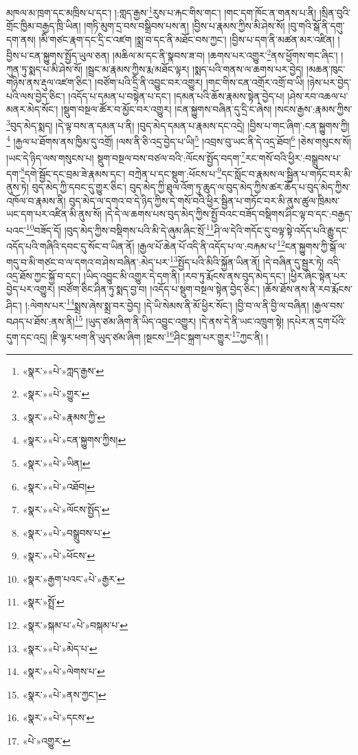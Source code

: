 མཁལ་མ་ཁྲག་དང་མཁྲིས་པ་དང་། །:གླད་རྒྱས་\footnote{«སྣར་»«པེ་»ཀླད་རྒྱས་}རུས་པ་རྐང་གིས་གང་། །གང་དག་ཁོང་ན་གནས་པ་ནི། །སྲིན་བུའི་གྲོང་ཁྱིམ་བརྒྱད་ཁྲི་ཡིན། །གཏི་མུག་དྲ་བས་བསྒྲིབས་པས་ན། །བྱིས་པ་རྣམས་ཀྱིས་མི་ཤེས་སོ། །བུ་གའི་སྒོ་ནི་དགུ་དག་ནས། །མི་གཙང་རྣག་དང་དྲི་ང་འཛག །སྨྲ་བ་དང་ནི་མཐོང་བས་ཀྱང་། །བྱིས་པ་དག་ནི་མཚན་མར་འཛིན། །བྱིས་པ་ངན་སྐྱུགས་སྤྱོད་ཡུལ་ཅན། །མཆིལ་མ་དང་ནི་སྣབས་ཟ་བ། །ཆགས་པར་འགྱུར་\footnote{«སྣར་»«པེ་»གྱུར་}ནས་ཕྱོགས་གང་ཞིང་། །ཀུན་ཏུ་སྨད་པ་མི་ཤེས་སོ། །སྦྲང་མ་རྣམས་ཀྱིས་རྨ་མཐོང་ལྟར། །སྨད་པའི་གནས་ལ་ཆགས་པར་བྱེད། །མཆན་ཁུང་གཉིས་ནས་རྡུལ་འཛག་ཅིང་། །བཙོག་པའི་དྲི་ནི་འབྱུང་བར་འགྱུར། །གང་གིས་ངན་འགྲོར་འགྲོ་བ་ཡི། །ཉེས་པར་བྱེད་པའི་ལས་བྱེད་ཅིང་། །འདོད་པ་དམན་པ་བསྟེན་པ་དང་། །དམན་པའི་ཆོས་རྣམས་སྟེན་བྱེད་པ། །ཤེས་རབ་འཆལ་པ་མནར་མེད་སོང་། །སྡུག་བསྔལ་ཚོར་བ་མྱོང་བར་འགྱུར། །ངན་སྐྱུགས་བཞིན་དུ་དྲི་ང་ཞེས། །སངས་རྒྱས་:རྣམས་ཀྱིས་\footnote{«སྣར་»«པེ་»རྣམས་ཀྱི་}བུད་མེད་སྨད། །དེ་ལྟ་བས་ན་དམན་པ་ནི། །བུད་མེད་དམན་པ་རྣམས་དང་འདྲེ། །བྱིས་པ་གང་ཞིག་:ངན་སྐྱུགས་ཀྱི།\footnote{«སྣར་»«པེ་»ངན་སྐྱུགས་ཀྱིས།} །རྐྱལ་པ་ཐོགས་ནས་ཁྱིམ་དུ་འགྲོ། །ལས་ནི་ཅི་འདྲ་བྱེད་པ་ཡི།\footnote{«སྣར་»«པེ་»ཡིན།} །འབྲས་བུ་ཡང་ནི་དེ་འདྲ་ཐོབ།\footnote{«སྣར་»«པེ་»འཐོབ།} །ཅེས་གསུངས་སོ། །ཡང་དེ་ཉིད་ལས་གསུངས་པ། སྡུག་བསྔལ་བས་བཙལ་བའི་:ལོངས་སྤྱོད་བདག་\footnote{«སྣར་»«པེ་»ལོངས་སྤྱོད་}རང་གསོ་བའི་ཕྱིར་:བསྒྲུབས་པ་དག་\footnote{«སྣར་»«པེ་»བསྒྲུབས་པ་}དགེ་སྦྱོང་དང་བྲམ་ཟེ་རྣམས་དང་། བཀྲེན་པ་དང་སྡུག་:ཕོངས་པ་\footnote{«སྣར་»«པེ་»ཕོངས་}དང་སློང་བ་རྣམས་ལ་སྦྱིན་པ་གཏོང་བར་མི་ནུས་ཏེ། བུད་མེད་ཀྱི་དབང་དུ་གྱུར་ཅིང་། བུད་མེད་ཀྱི་ཐུལ་འོག་ཏུ་ཆུད་ལ་བུད་མེད་ཀྱིས་ཚར་ཆོད་པ་བུད་མེད་ཀྱིས་འཁོལ་བ་རྣམས་ནི། བུད་མེད་ལ་དགའ་བ་དེ་ཉིད་ཀྱིས་དེ་གསོ་བའི་ཕྱིར་སྦྱིན་པ་གཏོང་བར་མི་ནུས་ཚུལ་ཁྲིམས་ཡང་དག་པར་འཛིན་མི་ནུས་སོ། །དེ་དེ་ལ་ཆགས་པས་བུད་མེད་ཀྱིས་སྤྱོ་བའང་བཟོད་བསྡིགས་ཤིང་ལྟ་བ་དང་:བརྒྱད་པའང་\footnote{«སྣར་»རྒྱག་པའང་«པེ་»རྒྱར་}བཟོད་དོ། །བུད་མེད་ཀྱིས་བསྡིགས་པའི་མི་དེ་ཞུམ་ཞིང་སྲོ་\footnote{«སྣར་»སྤྲོ་}ཤི་ལ་དེའི་གདོང་དུ་བལྟ་སྟེ་འདོད་པའི་རྒྱུ་དང་འདོད་པའི་གཞིའི་དབང་དུ་སོང་བ་ཡིན་ནོ། །རྒྱལ་པོ་ཆེན་པོ་འདི་ནི་འདོད་པ་ལ་:བརྐམ་པ་\footnote{«སྣར་»སྐམ་པ་«པེ་»བསྐམ་པ་}ངན་སྐྱུགས་ཀྱི་སྒོ་ལ་གདུ་བ་མི་གཙང་བ་ལ་དགའ་བ་ཤེས་བཞིན་:མེད་པར་\footnote{«སྣར་»«པེ་»མེད་པ་}སྤྱོད་པའི་མིའི་སྐྱོན་ཡིན་ནོ། །དེ་བཞིན་དུ་སྦྱར་ཏེ། འདི་འདྲ་ཐོས་ཀྱང་སྐྱོ་བ་དང་། །ཡིད་འབྱུང་མི་འགྱུར་དེ་དག་ནི། །རབ་ཏུ་རྨོངས་ནས་བུད་མེད་དང་། །ཕྱིར་ཞིང་སྟེན་པར་བྱེད་པར་འགྱུར། །བཙོག་ཅིང་ཤིན་ཏུ་སྨད་བྱ་བ། །འདོད་པ་སྡུག་བསྔལ་སྟེན་བྱེད་ཅིང་། །ཆོས་ཐོས་ནས་ནི་རབ་རྨོངས་ཤིང་། །:ལེགས་པར་\footnote{«སྣར་»«པེ་»ལེགས་པ་}སྨྲས་ཞེས་སྨྲ་བར་བྱེད། །དེ་ཡི་སེམས་ནི་མོ་ཕྱིར་སོང་། །བྱི་བ་ལ་ནི་བྱི་ལ་བཞིན། །རྒྱལ་བས་བཤད་པ་ཐོས་:ནས་ནི།\footnote{«སྣར་»«པེ་»ནས་ཀྱང་།} །ཡུད་ཙམ་ཞིག་ནི་ཡིད་འབྱུང་འགྱུར། །དེ་ནས་དེ་ནི་ཡང་འཁྲུག་སྟེ། །དཔེར་ན་དྲག་པོའི་དུག་དང་འདྲ། །ཇི་ལྟར་ཕག་ནི་ཡུད་ཙམ་ཞིག །སྔངས་\footnote{«སྣར་»«པེ་»དངས་}ཤིང་སྐྲག་པར་གྱུར་\footnote{«པེ་»འགྱུར་}ཀྱང་ནི། །
